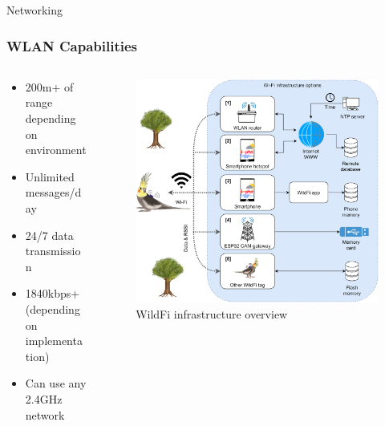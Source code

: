 \documentclass{beamer}
\begin{document}
  \begin{frame}{Networking}
    \frametitle{WLAN Capabilities}
    \begin{columns}
      \begin{column}{0.5\textwidth}
        \begin{itemize}
          \item 200m+ of range depending on environment
          \item Unlimited messages/day
          \item 24/7 data transmission
          \item 1840kbps+ (depending on implementation)
          \item Can use any 2.4GHz network
        \end{itemize}
      \end{column}
      \begin{column}{0.5\textwidth}
        \begin{figure}[htbp]
          \centering
          \includegraphics[width=\textwidth]{WildFi_IoT.jpg}
          \caption{WildFi infrastructure overview \cite{wild2023internet}}
          \label{fig:WildFi_infrastructure_overview}
        \end{figure}
      \end{column}
    \end{columns}
  \end{frame}
\end{document}
